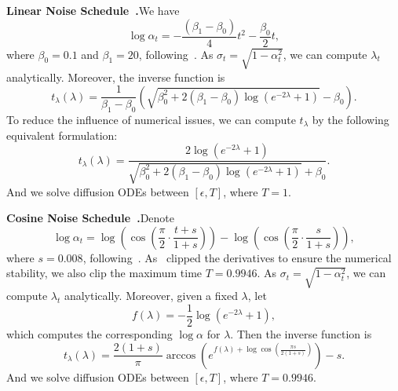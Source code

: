 \textbf{Linear Noise Schedule~\citep{ho2020denoising}.}\quad We have
\begin{equation*}
    \log\alpha_t = -\frac{(\beta_1-\beta_0)}{4}t^2 - \frac{\beta_0}{2}t,
\end{equation*}
where $\beta_0=0.1$ and $\beta_1=20$, following~\citep{song2020score}. As $\sigma_t=\sqrt{1-\alpha_t^2}$, we can compute $\lambda_t$ analytically. Moreover, the inverse function is
\begin{equation*}
    t_\lambda(\lambda) = \frac{1}{\beta_1-\beta_0}\left(\sqrt{\beta_0^2 + 2(\beta_1-\beta_0)\log\left(e^{-2\lambda}+1\right)} - \beta_0\right).
\end{equation*}
To reduce the influence of numerical issues, we can compute $t_\lambda$ by the following equivalent formulation:
\begin{equation*}
    t_\lambda(\lambda) = \frac{2\log\left(e^{-2\lambda}+1\right)}{\sqrt{\beta_0^2 + 2(\beta_1-\beta_0)\log\left(e^{-2\lambda}+1\right)} + \beta_0}.
\end{equation*}
And we solve diffusion ODEs between $[\epsilon, T]$, where $T=1$.

\textbf{Cosine Noise Schedule~\citep{nichol2021improved}.}\quad Denote
\begin{equation*}
    \log\alpha_t = \log\left(\cos\left( \frac{\pi}{2}\cdot\frac{t+s}{1+s} \right)\right) - \log\left(\cos\left( \frac{\pi}{2}\cdot\frac{s}{1+s} \right)\right),
\end{equation*}
where $s=0.008$, following~\citep{nichol2021improved}. As~\citep{nichol2021improved} clipped the derivatives to ensure the numerical stability, we also clip the maximum time $T=0.9946$.
As $\sigma_t=\sqrt{1-\alpha_t^2}$, we can compute $\lambda_t$ analytically. Moreover, given a fixed $\lambda$, let
\begin{equation*}
    f(\lambda) = -\frac{1}{2}\log\left(e^{-2\lambda} + 1\right),
\end{equation*}
which computes the corresponding $\log\alpha$ for $\lambda$. Then the inverse function is
\begin{equation*}
    t_{\lambda}(\lambda) = 
        \frac{2(1+s)}{\pi}\arccos\left(e^{f(\lambda) + \log\cos\left(\frac{\pi s}{2(1+s)}\right)}\right) - s.
\end{equation*}
And we solve diffusion ODEs between $[\epsilon, T]$, where $T=0.9946$.




